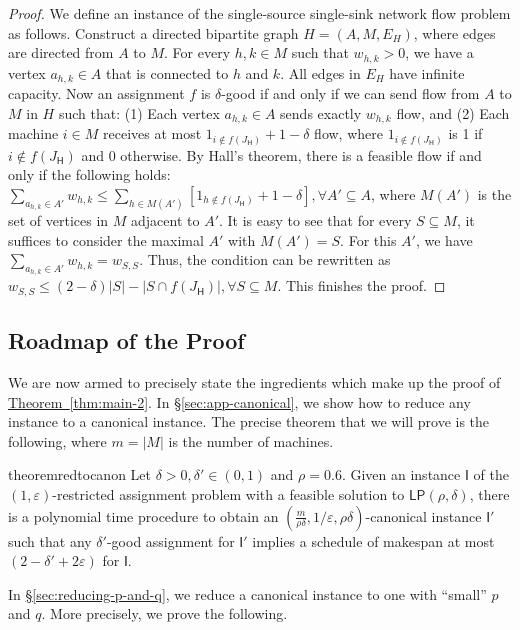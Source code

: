 \documentclass[11pt]{article}
\newcommand{\cardinal}[1]{\left|#1\right|}
\newcommand{\cI}{{\mathsf I}}
\newcommand{\sfH}{{\mathsf H}}
\newcommand{\eps}{\varepsilon}
\renewcommand{\epsilon}{\varepsilon}
\newcommand{\LP}{{\mathsf{LP}}}
\renewcommand{\epsilon}{\varepsilon}
\newcommand{\Sec}[1]{\texorpdfstring{\hyperref[sec:#1]{\S\ref*{sec:#1}}}{\S\ref*{sec:#1}}} \newcommand{\Eqn}[1]{\texorpdfstring{\hyperref[eq:#1]{(\ref*{eq:#1})}}{(\ref*{eq:#1})}} \newcommand{\Thm}[1]{\texorpdfstring{\hyperref[thm:#1]{Theorem~\ref*{thm:#1}}}{Theorem~\ref*{thm:#1}}} \newcommand{\Lem}[1]{\texorpdfstring{\hyperref[lem:#1]{Lemma~\ref*{lem:#1}}}{Lemma~\ref*{lem:#1}}} \newcommand{\Def}[1]{\texorpdfstring{\hyperref[def:#1]{Definition~\ref*{def:#1}}}{Definition~\ref*{def:#1}}} \newcommand{\Clm}[1]{\texorpdfstring{\hyperref[clm:#1]{Claim~\ref*{clm:#1}}}{Claim~\ref*{clm:#1}}} \newcommand{\App}[1]{\hyperref[app:#1]{Appendix~\ref*{app:#1}}}
\begin{document}
\begin{proof}
We define an instance of the single-source single-sink network flow problem as follows.  Construct a directed bipartite graph $H = (A, M, E_H)$, where edges are directed from $A$ to $M$. For every $h, k \in M$ such that $w_{h, k} > 0$, we have a vertex $a_{h,k} \in A$ that is connected to $h$ and $k$. All edges in $E_H$ have infinite capacity.  Now an assignment $f$ is $\delta$-good if and only if we can send flow from $A$ to $M$ in $H$ such that: (1) Each vertex $a_{h,k} \in A$ sends exactly $w_{h,k}$ flow, and (2)
Each machine $i \in M$ receives at most $1_{ i \notin f({J_\sfH})} + 1-\delta$ flow, where $1_{i \notin f({J_\sfH})}$ is 1 if $i \notin f({J_\sfH})$ and $0$ otherwise.
By Hall's theorem, there is a feasible flow if and only if the following holds:
$\sum_{a_{h, k} \in A'}w_{h,k} \leq \sum_{h \in M(A')} \left[1_{ h \notin f({J_\sfH})} + 1-\delta\right], \forall A' \subseteq A$,
where $M(A')$ is the set of vertices in $M$ adjacent to $A'$.  It is easy to see that for every $S \subseteq M$, it suffices to consider the maximal $A'$ with $M(A') = S$. For this $A'$, we have $\sum_{a_{h,k} \in A'}w_{h,k} = w_{S,S}$. Thus, the condition can be rewritten as 
$w_{S,S} \leq (2 - \delta)|S| - \cardinal{S\cap f({J_\sfH})}, \forall S \subseteq M$.
This finishes the proof.
\end{proof}

\subsection{Roadmap of the Proof}

We are now armed to precisely state the ingredients which make up the proof of \Thm{main-2}. 
In \Sec{app-canonical}, we show how to reduce any instance to a canonical instance.  
The precise theorem that we will prove is the following, where $m=|M|$ is the number of machines. 

\begin{restatable}{theorem}{redtocanon}
\label{thm:reducing-to-canonical-instances}\label{thm:1}
Let $\delta > 0, \delta' \in (0, 1)$ and $\rho = 0.6$. Given an instance $\cI$ of the $(1,\epsilon)$-restricted assignment problem with a feasible solution to $\LP(\rho,\delta)$, there is a polynomial time procedure to obtain an $(\frac{m}{\rho \delta},1/\eps,\rho\delta)$-canonical instance $\cI'$ such that any $\delta'$-good assignment for $\cI'$ implies a schedule of makespan at most $(2-\delta'+2\epsilon)$ for $\cI$.
\end{restatable}
\noindent
In \Sec{reducing-p-and-q}, we reduce a canonical instance to one with ``small'' $p$ and $q$. More precisely, we prove the following.
\end{document}
